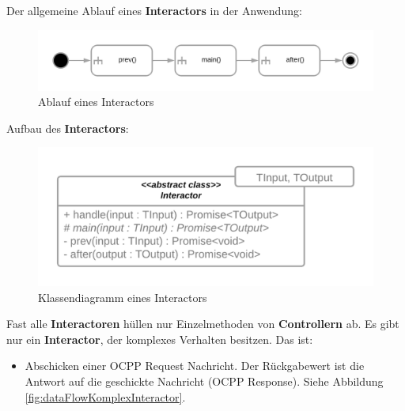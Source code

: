 Der allgemeine Ablauf eines \textbf{Interactors} in der Anwendung:
\begin{figure}[H]
    \centering
    \includegraphics[width=1\textwidth]{./images/InteractorAblauf.png}
    \caption[Ablauf eines Interactors]{Ablauf eines Interactors}
    \label{fig:InteractorFlow}
\end{figure}
Aufbau des \textbf{Interactors}:
\begin{figure}[H]
    \centering
    \includegraphics[width=1\textwidth]{./images/InteractorStructur.png}
    \caption[Klassendiagramm eines Interactors]{Klassendiagramm eines Interactors}
    \label{fig:InteractorStructur}
\end{figure}


Fast alle \textbf{Interactoren} hüllen nur Einzelmethoden von \textbf{Controllern} ab.
Es gibt nur ein \textbf{Interactor}, der komplexes Verhalten besitzen.
Das ist:
\begin{itemize}
    \item Abschicken einer OCPP Request Nachricht. Der Rückgabewert ist die Antwort auf die geschickte Nachricht (OCPP Response).
    Siehe Abbildung \ref{fig:dataFlowKomplexInteractor}.
\end{itemize}